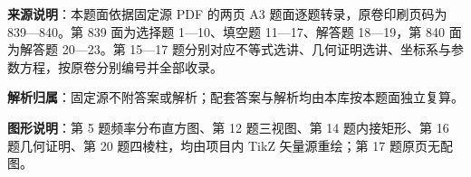 

\begin{gknotice}
\textbf{来源说明}：本题面依据固定源 PDF 的两页 A3 题面逐题转录，原卷印刷页码为 839—840。第 839 面为选择题 1—10、填空题 11—17、解答题 18—19，第 840 面为解答题 20—23。第 15—17 题分别对应不等式选讲、几何证明选讲、坐标系与参数方程，按原卷分别编号并全部收录。

\textbf{解析归属}：固定源不附答案或解析；配套答案与解析均由本库按本题面独立复算。

\textbf{图形说明}：第 5 题频率分布直方图、第 12 题三视图、第 14 题内接矩形、第 16 题几何证明、第 20 题四棱柱，均由项目内 TikZ 矢量源重绘；第 17 题原页无配图。
\end{gknotice}


